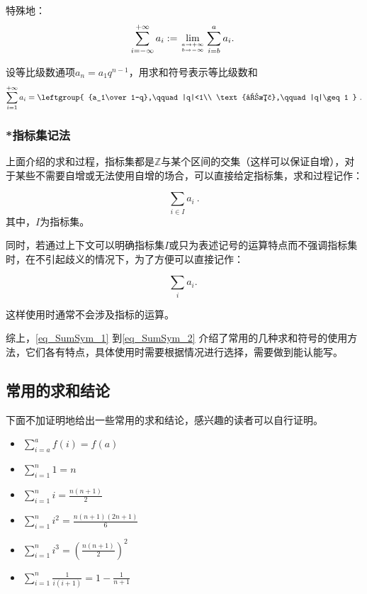 特殊地：
\begin{equation}
\sum_{i=-\infty}^{+\infty} a_i:= \lim_{a\to+\infty\atop b\to-\infty}\sum_{i=b}^a a_i.~
\end{equation}

\begin{example}{设等比级数通项$a_n=a_1q^{n-1}$，用求和符号表示等比级数和}
$$
\sum_{i=1}^{+\infty} a_i=
\leftgroup{
{a_1\over 1-q},\qquad |q|<1\\  
\text{发散},\qquad |q|\geq1
} ~.
$$
\end{example}

\subsubsection{*指标集记法}
上面介绍的求和过程，指标集都是$\mathbb{Z}$与某个区间的交集（这样可以保证自增），对于某些不需要自增或无法使用自增的场合，可以直接给定指标集，求和过程记作：

\begin{equation}
\sum_{i\in I} a_i~.
\end{equation}
其中，$I$为指标集。

同时，若通过上下文可以明确指标集$I$或只为表述记号的运算特点而不强调指标集时，在不引起歧义的情况下，为了方便可以直接记作：

\begin{equation}\label{eq_SumSym_2}
\sum_i a_i.~
\end{equation}

这样使用时通常不会涉及指标的运算。

综上，\autoref{eq_SumSym_1} 到\autoref{eq_SumSym_2} 介绍了常用的几种求和符号的使用方法，它们各有特点，具体使用时需要根据情况进行选择，需要做到能认能写。

\subsection{常用的求和结论}

下面不加证明地给出一些常用的求和结论，感兴趣的读者可以自行证明。
\begin{itemize}
\item $\sum\limits_{i=a}^a f(i) = f(a)$
\item $\sum\limits_{i=1}^n 1 = n$
\item $\sum\limits_{i=1}^n i = \frac{n(n+1)}{2}$
\item $\sum\limits_{i=1}^n i^2 = \frac{n(n+1)(2n+1)}{6}$
\item $\sum\limits_{i=1}^n i^3 = \left( \frac{n(n+1)}{2} \right)^2$
\item $\sum\limits_{i=1}^n \frac{1}{i(i+1)} = 1 - \frac{1}{n+1}$
\end{itemize}



